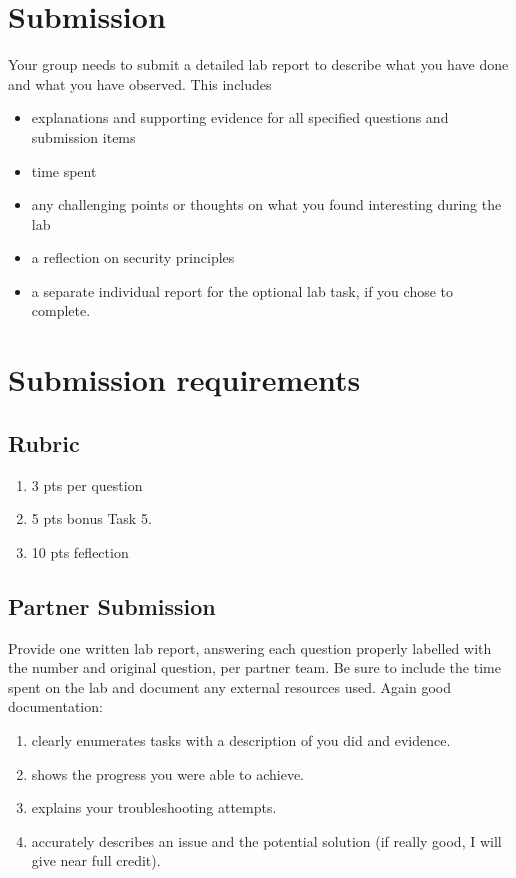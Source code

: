 \documentclass{article}
\begin{document}
\section{Submission}
Your group needs to submit a detailed lab report to describe what you have
done and what you have observed. This includes 
\begin{itemize}
\item explanations and supporting evidence for all specified questions and submission items
\item time spent
\item any challenging points or thoughts on what you found interesting during the lab 
\item a reflection on security principles
\item a separate individual report for the optional lab task, if you chose to complete.
\end{itemize}
 
 
\section{Submission requirements}

\subsection{Rubric}
\begin{enumerate}
\item 3 pts per question
\item 5 pts bonus Task 5.
\item 10 pts feflection 
\end{enumerate}


\subsection{Partner Submission}
Provide one written lab report, answering each question properly labelled with the number and original question, per partner team. Be sure to include the time spent on the lab and document any external resources used. 
Again good documentation: 
\begin{enumerate}
\item clearly enumerates tasks with a description of you did and evidence.  
\item shows the progress you were able to achieve.
\item explains your troubleshooting attempts.
\item accurately describes an issue and the potential solution (if really good, I will give near full credit).
\end{enumerate}
\end{document}
